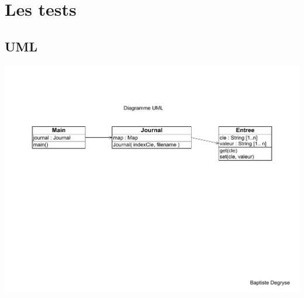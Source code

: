 \documentclass[a4paper]{article}
\begin{document}
\section*{Les tests}



\subsection*{UML}
\includegraphics[scale=0.5]{DiagrammeUML.pdf}
\end{document}
